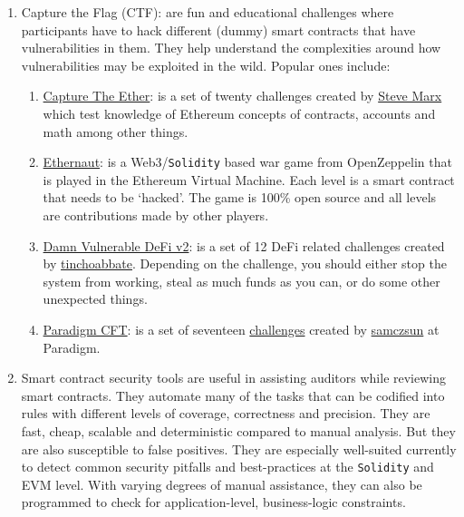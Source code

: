 \begin{enumerate}
\item Capture the Flag (CTF): are fun and educational challenges where participants have to hack different (dummy) smart contracts that have vulnerabilities in them. They help understand the complexities around how vulnerabilities may be exploited in the wild. Popular ones include:
	\begin{enumerate}
	\item\href{https://capturetheether.com/}{Capture The Ether}: is a set of twenty challenges created by \href{https://twitter.com/smarx}{Steve Marx} which test knowledge of Ethereum concepts of contracts, accounts and math among other things.
	\item\href{https://ethernaut.openzeppelin.com/}{Ethernaut}: is a Web3/\verb|Solidity| based war game from OpenZeppelin that is played in the Ethereum Virtual Machine. Each level is a smart contract that needs to be ‘hacked'. The game is 100\% open source and all levels are contributions made by other players.
	\item\href{https://www.damnvulnerabledefi.xyz/v2-release.html}{Damn Vulnerable DeFi v2}: is a set of 12 DeFi related challenges created by \href{https://twitter.com/tinchoabbate}{tinchoabbate}. Depending on the challenge, you should either stop the system from working, steal as much funds as you can, or do some other unexpected things.
	\item\href{https://ctf.paradigm.xyz/}{Paradigm CFT}: is a set of seventeen \href{https://github.com/paradigm-operations/paradigm-ctf-2021}{challenges} created by \href{https://twitter.com/samczsun}{samczsun} at Paradigm.
	\end{enumerate}

\item Smart contract security tools are useful in assisting auditors while reviewing smart contracts. They automate many of the tasks that can be codified into rules with different levels of coverage, correctness and precision. They are fast, cheap, scalable and deterministic compared to manual analysis. But they are also susceptible to false positives. They are especially well-suited currently to detect common security pitfalls and best-practices at the \verb|Solidity| and EVM level. With varying degrees of manual assistance, they can also be programmed to check for application-level, business-logic constraints.


\end{enumerate}
